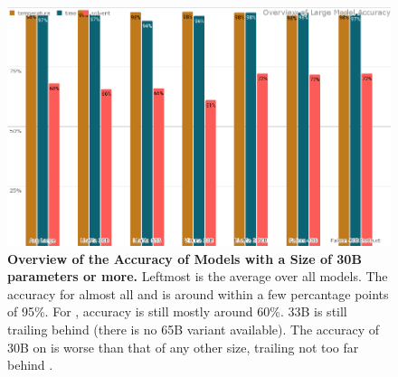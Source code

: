\begin{figure}[!htbp]
    \begin{centering}
        \includegraphics[width=\textwidth]{img/overview_large_accuracy}
        \caption[Overview of Large Model Accuracy]{\textbf{Overview of the Accuracy of Models with a Size of 30B parameters or more.}
        Leftmost is the average over all models.
        The accuracy for almost all \ttemp and \ttime is around within a few percantage points of 95\%.
        For \tsolv, accuracy is still mostly around 60\%.  33B is still trailing behind (there is no  65B variant available).
        The accuracy of  30B on \tsolv is worse than that of any other  size, trailing not too far behind .
        }
        \label{fig:large_acc}
    \end{centering}
\end{figure}

